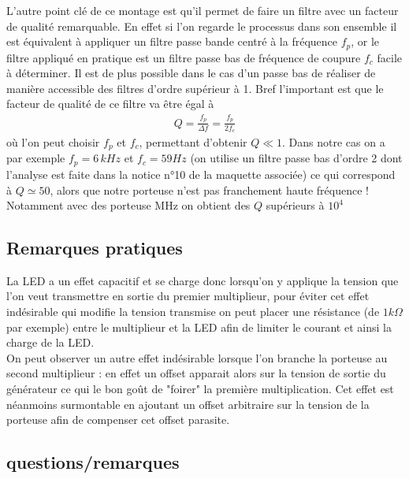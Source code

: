 \documentclass[12pt,prb,aps,epsf]{report}
\begin{document}
L'autre point clé de ce montage est qu'il permet de faire un filtre avec un facteur de qualité remarquable. En effet si l'on regarde le processus dans son ensemble il est équivalent à appliquer un filtre passe bande centré à la fréquence $f_p$, or le filtre appliqué en pratique est un filtre passe bas de fréquence de coupure $f_c$ facile à déterminer. Il est de plus possible dans le cas d'un passe bas de réaliser de manière accessible des filtres d'ordre supérieur à 1. Bref l'important est que le facteur de qualité de ce filtre va être égal à 
\begin{eqnarray}
Q = \frac{f_p}{\Delta f} = \frac{f_p}{2f_c}
\end{eqnarray}
où l'on peut choisir $f_p$ et $f_c$, permettant d'obtenir $Q\ll1$. Dans notre cas on a par exemple $f_p=6\,kHz$ et $f_c = 59Hz$ (on utilise un filtre passe bas d'ordre 2 dont l'analyse est faite dans la notice n°10 de la maquette associée) ce qui correspond à $Q \simeq 50$, alors que notre porteuse n'est pas franchement haute fréquence ! Notamment avec des porteuse MHz on obtient des $Q$ supérieurs à $10^4$

\subsection{Remarques pratiques}

La LED a un effet capacitif et se charge donc lorsqu'on y applique la tension que l'on veut transmettre en sortie du premier multiplieur, pour éviter cet effet indésirable qui modifie la tension transmise on peut placer une résistance (de $1k\Omega$ par exemple) entre le multiplieur et la LED afin de limiter le courant et ainsi la charge de la LED.\\

On peut observer un autre effet indésirable lorsque l'on branche la porteuse au second multiplieur : en effet un offset apparait alors sur la tension de sortie du générateur ce qui  le bon goût de "foirer" la première multiplication. Cet effet est néanmoins surmontable en ajoutant un offset arbitraire sur la tension de la porteuse afin de compenser cet offset parasite.

\subsection{questions/remarques}
\end{document}
